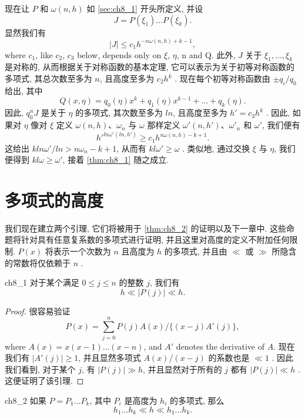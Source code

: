 现在让 $P$ 和 $\omega(n, h)$ 如 \autoref{sec:ch8_1} 开头所定义, 并设
\[J=P(\xi_1)\dots P(\xi_k).\]
显然我们有
\[|J| \leqslant c_1 h^{-n\omega(n, h)+k-1},\]
where $c_1$, like $c_2$, $c_3$ below, depends only on $\xi$, $\eta$, n and Q. 此外, $J$ 关于 $\xi_1, \ldots, \xi_k$ 是对称的, 从而根据关于对称函数的基本定理, 它可以表示为关于初等对称函数的多项式, 其总次数至多为 $n$, 且高度至多为 $c_2h^k$ . 现在每个初等对称函数由 $\pm q_i/q_0$ 给出, 其中
\[Q(x, \eta) = q_0(\eta) x^k + q_1(\eta) x^{k-1} + \ldots + q_k(\eta).\]
因此, $q_0^n J$ 是关于 $\eta$ 的多项式, 其次数至多为 $ln$, 且高度至多为 $h' = c_3 h^k$ . 因此, 如果对 $\eta$ 像对 $\xi$ 定义 $\omega(n, h)$、$\omega_n$ 与 $\omega$ 那样定义 $\omega'(n, h')$、$\omega'_n$ 和 $\omega'$, 我们便有
\[h'^{ln\omega'(ln,h')} \geqslant c_1 h^{n\omega(n,h)-k+1}.\]
这给出 $kln\omega'/ln > n\omega_n - k + 1$, 从而有 $kl\omega' \ge \omega$ . 类似地, 通过交换 $\xi$ 与 $\eta$, 我们便得到 $kl\omega \ge \omega'$, 接着 \autoref{thm:ch8_1} 随之成立.

\section{多项式的高度}\label{sec:ch8_4}

我们现在建立两个引理, 它们将被用于 \autoref{thm:ch8_2} 的证明以及下一章中. 这些命题将针对具有任意复系数的多项式进行证明, 并且这里对高度的定义不附加任何限制. $P(x)$ 将表示一个次数为 $n$ 且高度为 $h$ 的多项式, 并且由 $\ll$ 或 $\gg$ 所隐含的常数将仅依赖于 $n$ .

\begin{mylemma}{}{ch8_1}
对于某个满足 $0 \le j \le n$ 的整数 $j$, 我们有
\[h \ll |P(j)| \ll h.\]
\end{mylemma}

\begin{proof}
很容易验证
\[P(x) = \sum_{j=0}^{n} P(j) A(x)/\{(x-j) A'(j)\},\]
where $A(x) = x(x-1)\dots(x-n)$, and $A'$ denotes the derivative of $A$. 现在我们有 $|A'(j)| \ge 1$, 并且显然多项式 $A(x)/(x-j)$ 的系数也是 $\ll 1$ . 因此我们看到, 对于某个 $j$, 有 $|P(j)| \gg h$, 并且显然对于所有的 $j$ 都有 $|P(j)| \ll h$ . 这便证明了该引理.
\end{proof}

\begin{mylemma}{}{ch8_2}
如果 $P = P_1 \dots P_k$, 其中 $P_i$ 是高度为 $h_i$ 的多项式, 那么
\[h_1 \dots h_k \ll h \ll h_1 \dots h_k.\]
\end{mylemma}

